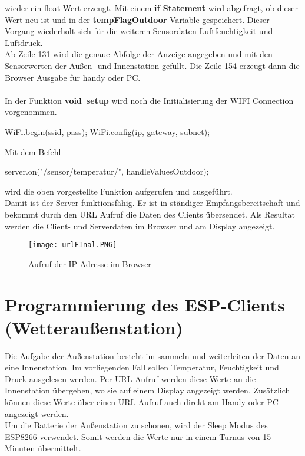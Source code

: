 \documentclass[12pt,a4paper]{scrartcl}	%
\begin{document}
wieder ein float Wert erzeugt. Mit einem \textbf{if Statement} wird abgefragt, ob dieser Wert neu ist und in der \textbf{tempFlagOutdoor} Variable gespeichert. Dieser Vorgang wiederholt sich für die weiteren Sensordaten Luftfeuchtigkeit und Luftdruck.\\
Ab Zeile 131 wird die genaue Abfolge der Anzeige angegeben und mit den Sensorwerten der Außen- und Innenstation gefüllt. Die Zeile 154 erzeugt dann die Browser Ausgabe für handy oder PC.\\
\\
In der Funktion \textbf{void~setup} wird noch die Initialisierung der WIFI Connection vorgenommen.
\begin{center}
	WiFi.begin(ssid, pass);
	WiFi.config(ip, gateway, subnet);
\end{center}
Mit dem Befehl 
\begin{center}
	 server.on("/sensor/temperatur/", handleValuesOutdoor);
\end{center}
wird die oben vorgestellte Funktion aufgerufen und ausgeführt.\\
Damit ist der Server funktionsfähig. Er ist in ständiger Empfangsbereitschaft und bekommt durch den URL Aufruf die Daten des Clients übersendet. Als Resultat werden die Client- und Serverdaten im Browser und am Display angezeigt.
\begin{figure}[htb]
	\centering
	\texttt{[image: urlFInal.PNG]}
	\caption{Aufruf der IP Adresse im Browser}
\end{figure}

\section{Programmierung des ESP-Clients (Wetteraußenstation)}
Die Aufgabe der Außenstation besteht im sammeln und weiterleiten der Daten an eine Innenstation. Im vorliegenden Fall sollen Temperatur, Feuchtigkeit und Druck ausgelesen werden. Per URL Aufruf werden diese Werte an die Innenstation übergeben, wo sie auf einem Display angezeigt werden. Zusätzlich können diese Werte über einen URL Aufruf auch direkt am Handy oder PC angezeigt werden.\\
Um die Batterie der Außenstation zu schonen, wird der Sleep Modus des ESP8266 verwendet. Somit werden die Werte nur in einem Turnus von 15 Minuten übermittelt.
\end{document}
